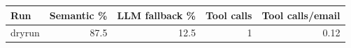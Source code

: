 \begin{tabular}{lrrrr}
\toprule
Run & Semantic \% & LLM fallback \% & Tool calls & Tool calls/email \\
\midrule
dryrun & 87.5 & 12.5 & 1 & 0.12 \\
\bottomrule
\end{tabular}

